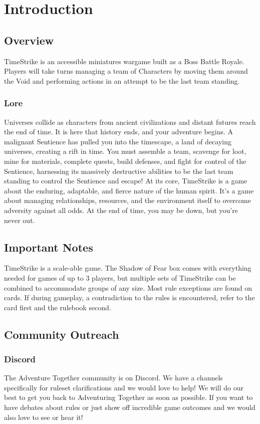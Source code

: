 \documentclass[../main.tex]{subfiles}
\begin{document}
\section{Introduction}

\subsection{Overview}
TimeStrike is an accessible miniatures wargame built as a Boss Battle Royale. Players will take turns managing a team of Characters by moving them around the Void and performing actions in an attempt to be the last team standing. 

\subsubsection{Lore}
Universes collide as characters from ancient civilizations and distant futures reach the end of time. It is here that history ends, and your adventure begins. A malignant Sentience has pulled you into the timescape, a land of decaying universes, creating a rift in time. You must assemble a team, scavenge for loot, mine for materials, complete quests, build defenses, and fight for control of the Sentience, harnessing its massively destructive abilities to be the last team standing to control the Sentience and escape! At its core, TimeStrike is a game about the enduring, adaptable, and fierce nature of the human spirit. It’s a game about managing relationships, resources, and the environment itself to overcome adversity against all odds. At the end of time, you may be down, but you’re never out.

\subsection{Important Notes}
TimeStrike is a scale-able game. The Shadow of Fear box comes with everything needed for games of up to 3 players, but multiple sets of TimeStrike can be combined to accommodate groups of any size.
Most rule exceptions are found on cards. If during gameplay, a contradiction to the rules is encountered, refer to the card first and the rulebook second.

\subsection{Community Outreach}
\subsubsection{Discord}
The Adventure Together community is on Discord. We have a channels specifically for ruleset clarifications and we would love to help!  We will do our best to get you back to Adventuring Together as soon as possible. If you want to have debates about rules or just show off incredible game outcomes and we would also love to see or hear it!
\end{document}
